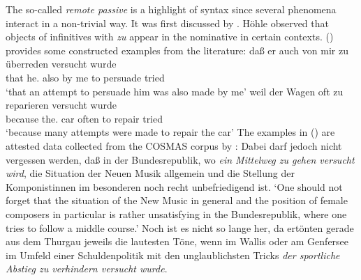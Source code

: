 The so-called \emph{remote passive} is a highlight of  syntax since several
phenomena interact in a non-trivial way. It was first discussed by \citet[--176]{Hoehle78a}. Höhle observed that objects of  infinitives with \emph{zu} appear in the
nominative in certain contexts. () provides some constructed examples from the literature:
\eal
\ex{}
\gll daß  er        auch von mir zu überreden versucht wurde\footnotemark\\
     that he.\NOM{} also by  me  to persuade  tried    \AUX\\\german
{}
\glt `that an attempt to persuade him was also made by me'
\ex 
\gll weil    der        Wagen oft   zu reparieren versucht wurde\\
     because the.\NOM{} car   often to repair     tried    \AUX\\
\glt `because many attempts were made to repair the car'\label{bsp-zu-reparieren-versucht-wurde}
\zl
The examples in () are attested data collected from the COSMAS corpus by \citet[--137]{Mueller2002b}:
\eal
\ex Dabei darf jedoch nicht vergessen werden, daß in der Bundesrepublik, wo \emph{ein Mittelweg zu gehen versucht wird}, 
die Situation der Neuen Musik allgemein und die Stellung der Komponistinnen im besonderen noch recht unbefriedigend ist.\footnotemark
%
\glt `One should not forget that the situation of the New Music in general and the position of female composers 
in particular is rather unsatisfying in the Bundesrepublik, where one tries to follow a middle course.'
\ex Noch ist es nicht so lange her, da ertönten gerade aus dem Thurgau jeweils die lautesten Töne, 
    wenn im Wallis oder am Genfersee im Umfeld einer Schuldenpolitik mit den unglaublichsten Tricks 
    \emph{der sportliche Abstieg zu verhindern versucht wurde}.\footnotemark
%
